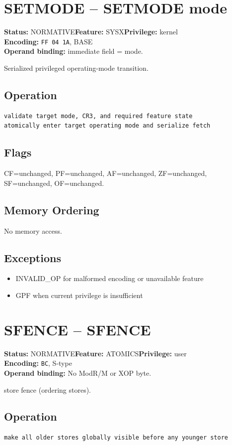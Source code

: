 \documentclass[10pt]{article}
\begin{document}
\section{SETMODE -- SETMODE mode}
\textbf{Status:} NORMATIVE\quad \textbf{Feature:} SYSX\quad \textbf{Privilege:} kernel\\
\textbf{Encoding:} \texttt{FF 04 1A}, BASE\\
\textbf{Operand binding:} immediate field = mode.

Serialized privileged operating-mode transition.

\subsection*{Operation}
\begin{lstlisting}
validate target mode, CR3, and required feature state
atomically enter target operating mode and serialize fetch
\end{lstlisting}
\subsection*{Flags}
CF=unchanged, PF=unchanged, AF=unchanged, ZF=unchanged, SF=unchanged, OF=unchanged.
\subsection*{Memory Ordering}
No memory access.
\subsection*{Exceptions}
\begin{itemize}
\item INVALID\_OP for malformed encoding or unavailable feature
\item GPF when current privilege is insufficient
\end{itemize}
\clearpage

\section{SFENCE -- SFENCE}
\textbf{Status:} NORMATIVE\quad \textbf{Feature:} ATOMICS\quad \textbf{Privilege:} user\\
\textbf{Encoding:} \texttt{BC}, S-type\\
\textbf{Operand binding:} No ModR/M or XOP byte.

store fence (ordering stores).

\subsection*{Operation}
\begin{lstlisting}
make all older stores globally visible before any younger store
\end{lstlisting}
\end{document}
